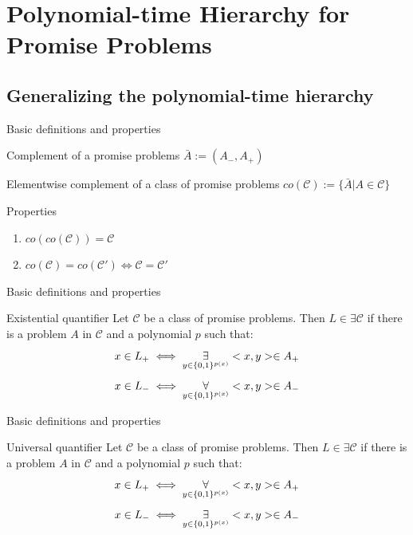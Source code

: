 \section{Polynomial-time Hierarchy for Promise Problems}
    \subsection{Generalizing the polynomial-time hierarchy}
        \begin{frame}{Basic definitions and properties}
            \begin{block}{Complement of a promise problems}
                $\bar{A} := (A_-,A_+)$
            \end{block}
            \pause
            \begin{block}{Elementwise complement of a class of promise problems}
                $co(\mathcal{C}) := \{\bar{A}| A\in \mathcal{C}\}$
            \end{block}
            \pause
            \begin{block}{Properties}
                \begin{enumerate}
                    \item $co(co(\mathcal{C})) = \mathcal{C}$
                    \item $co(\mathcal{C}) = co(\mathcal{C}') \iff \mathcal{C} = \mathcal{C}'$
                \end{enumerate}
            \end{block}
        \end{frame}
        \begin{frame}{Basic definitions and properties}
            \begin{block}{Existential quantifier}
                Let $\mathcal{C}$ be a class of promise problems. Then $L \in \exists \mathcal{C}$ if there is a problem $A$ in $\mathcal{C}$ and a polynomial $p$ such that:
                $$x\in L_+ \iff \overset{{}}{\underset{{y \in \{0,1\}^{p(x)}}}{\Large \exists}} <x,y> \in A_+$$
                $$x\in L_- \iff \overset{{}}{\underset{{y \in \{0,1\}^{p(x)}}}{\Large \forall}} <x,y> \in A_-$$
            \end{block}
        \end{frame}
        \begin{frame}{Basic definitions and properties}
            \begin{block}{Universal quantifier}
                Let $\mathcal{C}$ be a class of promise problems. Then $L \in \exists \mathcal{C}$ if there is a problem $A$ in $\mathcal{C}$ and a polynomial $p$ such that:
                $$x\in L_+ \iff \overset{{}}{\underset{{y \in \{0,1\}^{p(x)}}}{\Large \forall}} <x,y> \in A_+$$
                $$x\in L_- \iff \overset{{}}{\underset{{y \in \{0,1\}^{p(x)}}}{\Large \exists}} <x,y> \in A_-$$
            \end{block}
        \end{frame}
